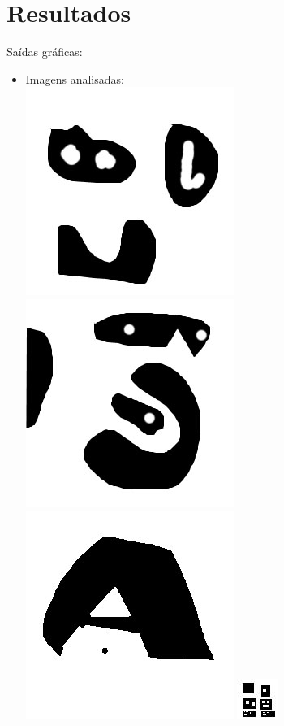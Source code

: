 \documentclass[conference]{IEEEtran}
\begin{document}
\section{Resultados} 
\label{sec:meth} 
Sa\'idas gr\'aficas:
\begin{itemize}
  	\item Imagens analisadas:\\
		\centering\includegraphics[scale=0.5]{images/fig1}
		\centering\includegraphics[scale=0.5]{images/fig2}
		\centering\includegraphics[scale=0.5]{images/fig3}
		\centering\includegraphics[scale=10.0]{images/fig4}
		\vspace{2\baselineskip}\vspace{-\parskip}


\end{itemize}
\end{document}
